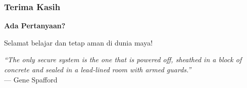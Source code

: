 \documentclass[t,aspectratio=169,xcolor=dvipsnames]{beamer}
\begin{document}
\begin{frame}
    \frametitle{Terima Kasih}
    \begin{center}
        \Huge \textbf{Ada Pertanyaan?}

        \vspace{0.8cm}
        \normalsize
        Selamat belajar dan tetap aman di dunia maya!

        \vspace{0.8cm}
        \small
        \textit{``The only secure system is the one that is powered off, sheathed in a block of concrete and sealed in a lead-lined room with armed guards.''} \\
        \vspace{0.1cm}
        --- Gene Spafford
    \end{center}
\end{frame}
\end{document}
